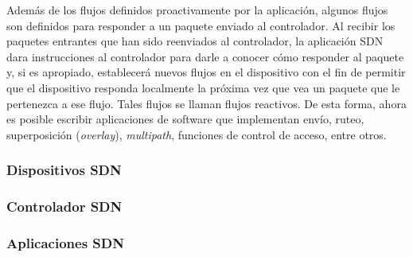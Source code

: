 \documentclass[10pt,journal,compsoc]{IEEEtran}
\begin{document}
Además de los flujos definidos proactivamente por la aplicación, algunos flujos son definidos para responder a un paquete enviado al controlador. Al recibir los paquetes entrantes que han sido reenviados al controlador, la aplicación SDN dara instrucciones al controlador para darle a conocer cómo responder al paquete y, si es apropiado, establecerá nuevos flujos en el dispositivo con el fin de permitir que el dispositivo responda localmente la próxima vez que vea un paquete que le pertenezca a ese flujo. Tales flujos se llaman flujos reactivos. De esta forma, ahora es posible escribir aplicaciones de software que implementan envío, ruteo, superposición (\emph{overlay}), \emph{multipath}, funciones de control de acceso, entre otros.

\subsubsection{Dispositivos SDN}

\subsubsection{Controlador SDN}

\subsubsection{Aplicaciones SDN}



 




\end{document}
